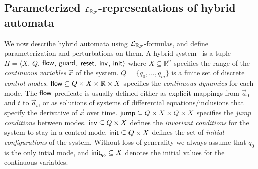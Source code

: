 \subsection{Parameterized $\mathcal{L}_{\mathbb{R}_{\mathcal{F}}}$-representations of hybrid automata}

We now describe hybrid automata using $\mathcal{L}_{\mathbb{R}_{\mathcal{F}}}$-formulas, and define parameterization and perturbations on them.
%
A hybrid system~\citep{henzinger96} is a tuple $H = \langle X$, $Q$, $\mathsf{flow}$, $\mathsf{guard}$, $\mathsf{reset}$, $\mathsf{inv}$, $\mathsf{init}\rangle$
where $X\subseteq \mathbb{R}^n$ specifies the range of the {\em continuous variables}  $\vec x$ of the system. $Q=\{q_0,...,q_m\}$ is a finite set of discrete {\em control modes}. $\mathsf{flow} \subseteq Q\times X\times \mathbb{R} \times X$ specifies the {\em continuous dynamics} for each mode. The $\mathsf{flow}$ predicate is usually defined either as explicit mappings from $\vec a_0$ and $t$ to $\vec a_t$,  or as solutions of systems of differential equations/inclusions that specify the derivative of $\vec x$ over time. $\mathsf{jump}\subseteq Q\times X\times Q\times X$ specifies the {\em jump conditions} between modes. $\mathsf{inv} \subseteq Q\times X$ defines the {\em invariant conditions} for the system to stay in a control mode. $\mathsf{init} \subseteq Q\times X$ defines the set of {\em initial configurations} of the system. Without loss of generality we always assume that $q_0$ is the only intial mode, and $\mathsf{init}_{q_0}\subseteq X$ denotes the initial values for the continuous variables.
